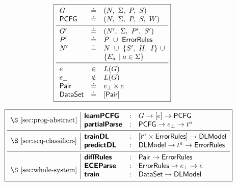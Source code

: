 \begin{figure}[t]
\small
\begin{minipage}[t]{0.38\linewidth}
  \small
  \lstDeleteShortInline{|}
  \[
  \boxed{
  \begin{array}{lcl}
    G              & \defeq  & (N,\ \Sigma,\ P,\ S) \\
    \pcfgsym       & \defeq  & (N,\ \Sigma,\ P,\ S,\ W) \\
    \midrule
    G'             & \defeq  & (N',\ \Sigma,\ P',\ S') \\
    P'             & \defeq  & P\ \cup\ \errorrulessym \\
    N'             & \defeq  & N\ \cup\ \{S',\ H,\ I\}\ \cup\\
                   &         & \{E_a\ |\ a \in \Sigma\} \\
    \midrule
    e              & \in    & L(G) \\
    e_{\bot}       & \notin & L(G) \\
    \pairsym       & \defeq & e_{\bot} \times e \\
    \datasetsym    & \defeq & \List{\pairsym} \\
  \end{array}
  }
  \]
  \lstMakeShortInline[language=Python, mathescape=true]{|}
\end{minipage}
\begin{minipage}[t]{0.61\linewidth}
  \small
  \lstDeleteShortInline{|}
  \[
  \boxed{
  \begin{array}{c|lcl}
    \multirow{2}{*}{\S~\ref{sec:prog-abstract}}   & \learnPCFGsym  & : & G \to \List{e} \to \pcfgsym \\
                                                  & \partialsym    & : & \pcfgsym \to e_{\bot} \to t^a  \\
                                                    \midrule
    \multirow{2}{*}{\S~\ref{sec:seq-classifiers}} & \trainDLsym    & : & \List{t^a \times \errorrulessym} \to \Model \\
                                                  & \predictDLsym  & : & \Model \to t^a \to \errorrulessym \\
                                                    \midrule
    \multirow{4}{*}{\S~\ref{sec:whole-system}}    & \diffsym       & : & \pairsym \to \errorrulessym \\
                                                  & \ecepsym       & : & \errorrulessym \to e_{\bot} \to e \\
                                                  & \trainsym      & : & \datasetsym \to \Model \\

\end{array}}\]
\end{minipage}
\end{figure}

